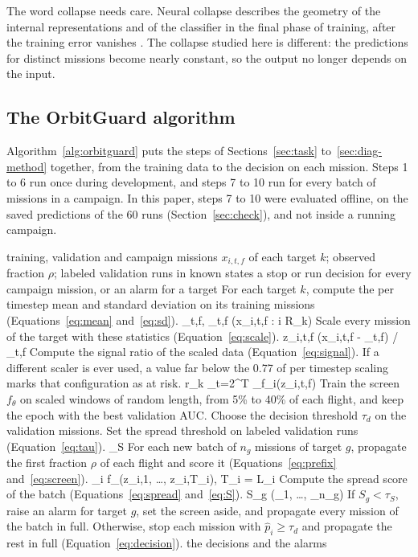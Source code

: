 The word collapse needs care. Neural collapse describes the geometry of the internal representations and of the classifier in the final phase of training, after the training error vanishes \cite{papyan2020}. The collapse studied here is different: the predictions for distinct missions become nearly constant, so the output no longer depends on the input.

\subsection{The OrbitGuard algorithm}
\label{sec:algorithm}

Algorithm~\ref{alg:orbitguard} puts the steps of Sections~\ref{sec:task} to~\ref{sec:diag-method} together, from the training data to the decision on each mission. Steps 1 to 6 run once during development, and steps 7 to 10 run for every batch of missions in a campaign. In this paper, steps 7 to 10 were evaluated offline, on the saved predictions of the 60 runs (Section~\ref{sec:check}), and not inside a running campaign.

\begin{algorithm}
\caption{The OrbitGuard screening framework}
\label{alg:orbitguard}
\REQUIRE training, validation and campaign missions $x_{i,t,f}$ of each target $k$; observed fraction $\rho$; labeled validation runs in known states
\ENSURE a stop or run decision for every campaign mission, or an alarm for a target
\STATE For each target $k$, compute the per timestep mean and standard deviation on its training missions (Equations~\ref{eq:mean} and~\ref{eq:sd}).
\EQ \mu_{t,f}, \sigma_{t,f} \gets {}(x_{i,t,f} : i \in R_k)
\STATE Scale every mission of the target with these statistics (Equation~\ref{eq:scale}).
\EQ z_{i,t,f} \gets (x_{i,t,f} - \mu_{t,f}) / \sigma_{t,f}
\STATE Compute the signal ratio of the scaled data (Equation~\ref{eq:signal}). If a different scaler is ever used, a value far below the 0.77 of per timestep scaling marks that configuration as at risk.
\EQ r_k \gets {} \sum_{t=2}^{T}{ \sum_{f}{_i(z_{i,t,f})}}
\STATE Train the screen $f_\theta$ on scaled windows of random length, from 5\% to 40\% of each flight, and keep the epoch with the best validation AUC.
\STATE Choose the decision threshold $\tau_d$ on the validation missions.
\STATE Set the spread threshold on labeled validation runs (Equation~\ref{eq:tau}).
\EQ \tau_S \gets {}
\STATE For each new batch of $n_g$ missions of target $g$, propagate the first fraction $\rho$ of each flight and score it (Equations~\ref{eq:prefix} and~\ref{eq:screen}).
\EQ {}_i \gets f_\theta(z_{i,1}, \ldots, z_{i,T_i}), \quad T_i = \lfloor \rho L_i \rfloor
\STATE Compute the spread score of the batch (Equations~\ref{eq:spread} and~\ref{eq:S}).
\EQ S_g  (_1, \ldots, _{n_g})
\STATE If $S_g < \tau_S$, raise an alarm for target $g$, set the screen aside, and propagate every mission of the batch in full.
\STATE Otherwise, stop each mission with $\hat{p}_i \ge \tau_d$ and propagate the rest in full (Equation~\ref{eq:decision}).
\RETURN the decisions and the alarms
\end{algorithm}

